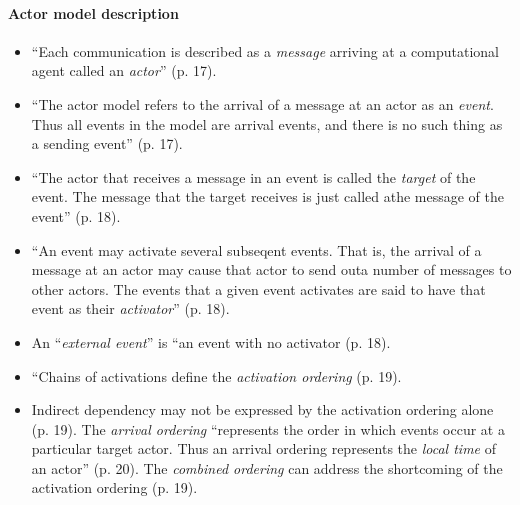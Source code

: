 \paragraph{Actor model description}
\begin{itemize}
\item ``Each communication is described as a \emph{message} arriving at a computational agent called an \emph{actor}'' (p. 17).
\item ``The actor model refers to the arrival of a message at an actor as an \emph{event}. Thus all events in the model are arrival events, and there is no such thing as a sending event'' (p. 17).
\item ``The actor that receives a message in an event is called the \emph{target} of the event. The message that the target receives is just called athe message of the event'' (p. 18).
\item ``An event may activate several subseqent events. That is, the arrival of a message at an actor may cause that actor to send outa number of messages to other actors. The events that a given event activates are said to have that event as their \emph{activator}'' (p. 18).
\item An ``\emph{external event}'' is ``an event with no activator (p.  18).
\item ``Chains of activations define the \emph{activation ordering} (p. 19).
\item Indirect dependency may not be expressed by the activation ordering alone (p. 19). The \emph{arrival ordering} ``represents the order in which events occur at a particular target actor. Thus an arrival ordering represents the \emph{local time} of an actor'' (p. 20). The \emph{combined ordering} can address the shortcoming of the activation ordering (p. 19).
\end{itemize}

